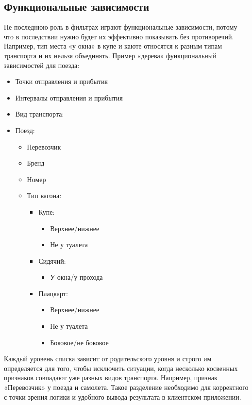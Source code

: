 \subsection{Функциональные зависимости}
Не последнюю роль в фильтрах играют функциональные зависимости, потому что в последствии нужно будет их эффективно показывать без противоречий. Например, тип места «у окна» в купе и каюте относятся к разным типам транспорта и их нельзя объединять. Пример «дерева» функциональный зависимостей для поезда:
\begin{itemize}
    \item Точки отправления и прибытия
    \item Интервалы отправления и прибытия
    \item Вид транспорта:
    \item Поезд:
    \begin{itemize}
	    \item Перевозчик
	    \item Бренд
	    \item Номер
	    \item Тип вагона:
	    \begin{itemize}
	    	\item Купе:
	    	\begin{itemize}
	    		\item Верхнее/нижнее
	    		\item Не у туалета
	    	\end{itemize}
	    	\item Сидячий:
	    	\begin{itemize}
	    		\item У окна/у прохода
	    	\end{itemize}
	    	\item Плацкарт:
	    	\begin{itemize}
	    		\item Верхнее/нижнее
	    		\item Не у туалета
	    		\item Боковое/не боковое
	    	\end{itemize}
	    \end{itemize}
	\end{itemize}
\end{itemize}

Каждый уровень списка зависит от родительского уровня и строго им определяется для того, чтобы исключить ситуации, когда несколько косвенных признаков совпадают уже разных видов транспорта. Например, признак «Перевозчик» у поезда и самолета. Такое разделение необходимо для корректного с точки зрения логики и удобного вывода результата в клиентском приложении.

